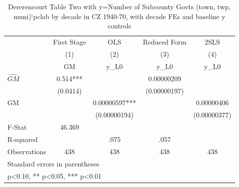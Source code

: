 \begin{table}[htbp]\centering
\def\sym#1{\ifmmode^{#1}\else\(^{#1}\)\fi}
\caption{Dererencourt Table Two with y=Number of Subcounty Govts (town, twp, muni)`pclab by decade in CZ 1940-70, with decade FEs and baseline y controls}
\begin{tabular}{l*{4}{c}}
\toprule
                    & First Stage   &         OLS   &Reduced Form   &        2SLS   \\
                    &\multicolumn{1}{c}{(1)}&\multicolumn{1}{c}{(2)}&\multicolumn{1}{c}{(3)}&\multicolumn{1}{c}{(4)}\\
                    &\multicolumn{1}{c}{GM}&\multicolumn{1}{c}{y\_L0}&\multicolumn{1}{c}{y\_L0}&\multicolumn{1}{c}{y\_L0}\\
\midrule
$\hat{GM}$          &       0.514***&               &  0.00000209   &               \\
                    &    (0.0414)   &               &(0.00000197)   &               \\
\addlinespace
GM                  &               &  0.00000597***&               &  0.00000406   \\
                    &               &(0.00000194)   &               &(0.00000377)   \\
\midrule
F-Stat              &      46.369   &               &               &               \\
R-squared           &               &        .075   &        .057   &               \\
Observations        &         438   &         438   &         438   &         438   \\
\bottomrule
\multicolumn{5}{l}{\footnotesize Standard errors in parentheses}\\
\multicolumn{5}{l}{\footnotesize * p<0.10, ** p<0.05, *** p<0.01}\\
\end{tabular}
\end{table}
